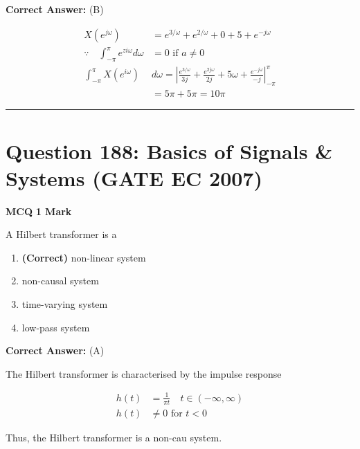 \documentclass[11pt,a4paper]{article}
\begin{document}
\noindent \textbf{Correct Answer:} (B)

\begin{tcolorbox}[solbox, title=Detailed Solution -- Question 187]
\[
\begin{aligned} X\left(e^{j \omega}\right)&=e^{3 / \omega}+e^{2 / \omega}+0+5+e^{-j \omega} \\ \because\quad \int_{-\pi}^{\pi} e^{z i \omega} d \omega&=0 \text { if } a \neq 0 \\ \int_{-\pi}^{\pi} X\left(e^{i \omega}\right) & d \omega=\left|\frac{e^{3 / \omega}}{3 j}+\frac{e^{2 j \omega}}{2 j}+5 \omega+\frac{e^{-j \omega}}{-j}\right|_{-\pi}^{\pi} \\ &=5 \pi+5 \pi=10 \pi \end{aligned}
\]
\end{tcolorbox}

\vspace{1.5em}
\hrule
\vspace{1.5em}

\section*{Question 188: Basics of Signals \& Systems (GATE EC 2007)}
\noindent \textbf{\color{primary}MCQ} \hfill \textbf{\color{secondary}1 Mark}


\noindent A Hilbert transformer is a


\begin{enumerate}[label=(\Alph*)]
    \item \textbf{(Correct)} non-linear system
    \item non-causal system
    \item time-varying system
    \item low-pass system
\end{enumerate}

\noindent \textbf{Correct Answer:} (A)

\begin{tcolorbox}[solbox, title=Detailed Solution -- Question 188]
The Hilbert transformer is characterised by the impulse response

\[
\begin{aligned}
h(t) &=\frac{1}{\pi t} \quad t \in(-\infty, \infty) \\
h(t) & \neq 0 \text { for } t < 0
\end{aligned}
\]

Thus, the Hilbert transformer is a non-cau  system.
\end{tcolorbox}
\end{document}

